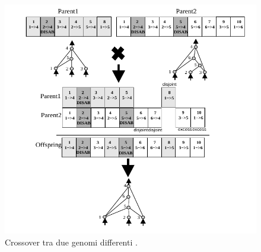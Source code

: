 \begin{figure}[H]
	\includegraphics[width=\textwidth]{img/neat-crossover.png}
	\caption{Crossover tra due genomi differenti \cite{stanley2002evolving}.}
	\label{fig:neatcrossover}
\end{figure}
